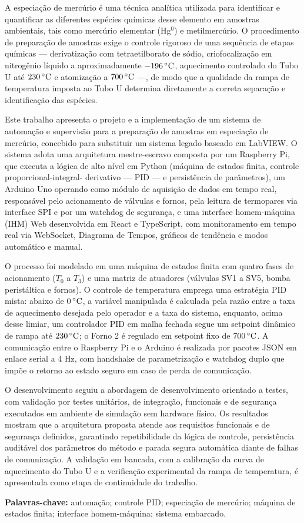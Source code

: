 A especiação de mercúrio é uma técnica analítica utilizada para identificar e
quantificar as diferentes espécies químicas desse elemento em amostras
ambientais, tais como mercúrio elementar (Hg$^0$) e metilmercúrio. O
procedimento de preparação de amostras exige o controle rigoroso de uma
sequência de etapas químicas --- derivatização com tetraetilborato de sódio,
criofocalização em nitrogênio líquido a aproximadamente $-196\,\celsius$,
aquecimento controlado do Tubo U até $230\,\celsius$ e atomização a
$700\,\celsius$ ---, de modo que a qualidade da rampa de temperatura imposta ao
Tubo U determina diretamente a correta separação e identificação das espécies.

Este trabalho apresenta o projeto e a implementação de um sistema de automação e
supervisão para a preparação de amostras em especiação de mercúrio, concebido
para substituir um sistema legado baseado em LabVIEW. O sistema adota uma
arquitetura mestre-escravo composta por um Raspberry Pi, que executa a lógica de
alto nível em Python (máquina de estados finita, controle proporcional-integral-
derivativo --- PID --- e persistência de parâmetros), um Arduino Uno operando
como módulo de aquisição de dados em tempo real, responsável pelo acionamento de
válvulas e fornos, pela leitura de termopares via interface SPI e por um
watchdog de segurança, e uma interface homem-máquina (IHM) Web desenvolvida em
React e TypeScript, com monitoramento em tempo real via WebSocket, Diagrama de
Tempos, gráficos de tendência e modos automático e manual.

O processo foi modelado em uma máquina de estados finita com quatro fases de
acionamento ($T_0$ a $T_3$) e uma matriz de atuadores (válvulas SV1 a SV5,
bomba peristáltica e fornos). O controle de temperatura emprega uma estratégia
PID mista: abaixo de $0\,\celsius$, a variável manipulada é calculada pela razão
entre a taxa de aquecimento desejada pelo operador e a taxa do sistema,
enquanto, acima desse limiar, um controlador PID em malha fechada segue um
setpoint dinâmico de rampa até $230\,\celsius$; o Forno 2 é regulado em setpoint
fixo de $700\,\celsius$. A comunicação entre o Raspberry Pi e o Arduino é
realizada por pacotes JSON em enlace serial a 4 Hz, com handshake de
parametrização e watchdog duplo que impõe o retorno ao estado seguro em caso de
perda de comunicação.

O desenvolvimento seguiu a abordagem de desenvolvimento orientado a testes, com
validação por testes unitários, de integração, funcionais e de segurança
executados em ambiente de simulação sem hardware físico. Os resultados mostram
que a arquitetura proposta atende aos requisitos funcionais e de segurança
definidos, garantindo repetibilidade da lógica de controle, persistência
auditável dos parâmetros do método e parada segura automática diante de falhas
de comunicação. A validação em bancada, com a calibração da curva de aquecimento
do Tubo U e a verificação experimental da rampa de temperatura, é apresentada
como etapa de continuidade do trabalho.

\vspace{0.5cm}
\noindent\textbf{Palavras-chave:} automação; controle PID; especiação de
mercúrio; máquina de estados finita; interface homem-máquina; sistema embarcado.
